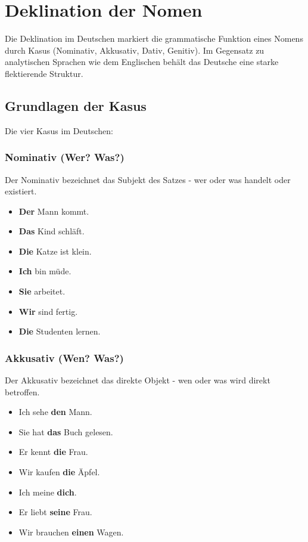 \chapter{Deklination der Nomen}
\label{cha:Deklination}

Die Deklination im Deutschen markiert die grammatische Funktion eines Nomens durch Kasus (Nominativ, Akkusativ, Dativ, Genitiv). Im Gegensatz zu analytischen Sprachen wie dem Englischen behält das Deutsche eine starke flektierende Struktur.

\section{Grundlagen der Kasus}
\label{sec:Kasus}

Die vier Kasus im Deutschen:

\subsection{Nominativ (Wer? Was?)}
\begin{tcolorbox}[title=Funktion]
Der Nominativ bezeichnet das Subjekt des Satzes - wer oder was handelt oder existiert.
\end{tcolorbox}

\begin{itemize}
    \item \textbf{Der} Mann kommt.
    \item \textbf{Das} Kind schläft.
    \item \textbf{Die} Katze ist klein.
    \item \textbf{Ich} bin müde.
    \item \textbf{Sie} arbeitet.
    \item \textbf{Wir} sind fertig.
    \item \textbf{Die} Studenten lernen.
\end{itemize}

\subsection{Akkusativ (Wen? Was?)}
\begin{tcolorbox}[title=Funktion]
Der Akkusativ bezeichnet das direkte Objekt - wen oder was wird direkt betroffen.
\end{tcolorbox}

\begin{itemize}
    \item Ich sehe \textbf{den} Mann.
    \item Sie hat \textbf{das} Buch gelesen.
    \item Er kennt \textbf{die} Frau.
    \item Wir kaufen \textbf{die} Äpfel.
    \item Ich meine \textbf{dich}.
    \item Er liebt \textbf{seine} Frau.
    \item Wir brauchen \textbf{einen} Wagen.
\end{itemize}

